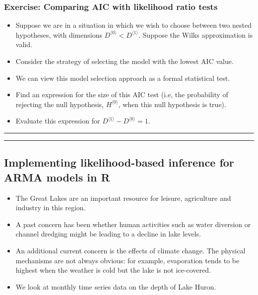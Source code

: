 \documentclass[]{article}
\begin{document}
\subsubsection{Exercise: Comparing AIC with likelihood ratio
tests}\label{exercise-comparing-aic-with-likelihood-ratio-tests}

\begin{itemize}
\item
  Suppose we are in a situation in which we wish to choose between two
  nested hypotheses, with dimensions
  \(D^{\langle 0\rangle}< D^{\langle 1\rangle}\). Suppose the Wilks
  approximation is valid.
\item
  Consider the strategy of selecting the model with the lowest AIC
  value.
\item
  We can view this model selection approach as a formal statistical
  test.
\item
  Find an expression for the size of this AIC test (i.e, the probability
  of rejecting the null hypothesis, \(H^{\langle 0\rangle}\), when this
  null hypothesis is true).
\item
  Evaluate this expression for
  \(D^{\langle 1\rangle} - D^{\langle 0\rangle}=1\).
\end{itemize}

\begin{center}\rule{0.5\linewidth}{\linethickness}\end{center}

\begin{center}\rule{0.5\linewidth}{\linethickness}\end{center}

\subsection{Implementing likelihood-based inference for ARMA models in
R}\label{implementing-likelihood-based-inference-for-arma-models-in-r}

\begin{itemize}
\item
  The Great Lakes are an important resource for leisure, agriculture and
  industry in this region.
\item
  A past concern has been whether human activities such as water
  diversion or channel dredging might be leading to a decline in lake
  levels.
\item
  An additional current concern is the effects of climate change. The
  physical mechanisms are not always obvious: for example, evaporation
  tends to be highest when the weather is cold but the lake is not
  ice-covered.
\item
  We look at monthly time series data on the depth of Lake Huron.
\end{itemize}
\end{document}
